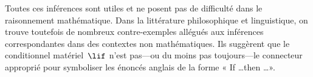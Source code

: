 \documentclass[../../../include/open-logic-section]{subfiles}
\begin{document}
Toutes ces inférences sont utiles et ne posent pas de difficulté dans
le raisonnement mathématique. Dans la littérature philosophique et
linguistique, on trouve toutefois de nombreux contre-exemples
allégués aux inférences correspondantes dans des contextes non
mathématiques. Ils suggèrent que le conditionnel matériel~$\lif$
n'est pas---ou du moins pas toujours---le connecteur approprié pour
symboliser les énoncés anglais de la forme « If \dots then \dots ».
\end{document}
